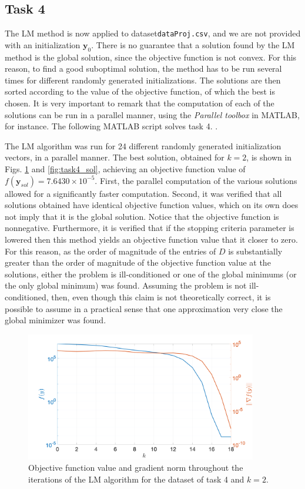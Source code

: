\documentclass[12pt]{article}
\begin{document}
\subsection{Task 4}
The LM method is now applied to dataset\verb|dataProj.csv|, and we are not provided with an initialization $\mathbf{y}_0$. There is no guarantee that a solution found by the LM method is the global solution, since the objective function is not convex. For this reason, to find a good suboptimal solution, the method has to be run several times for different randomly generated initializations. The solutions are then sorted according to the value of the objective function, of which the best is chosen. It is very important to remark that the computation of each of the solutions can be run in a parallel manner, using the \textit{Parallel toolbox} in MATLAB, for instance. The following MATLAB script solves task 4.
.

The LM algorithm was run for 24 different randomly generated initialization vectors, in a parallel manner. The best solution, obtained for $k=2$, is shown in Figs. \ref{fig:task4_LM} and \ref{fig:task4_sol}, achieving an objective function value of $f(\mathbf{y}_{sol}) = 7.6430\times 10^{-5}$. First, the parallel computation of the various solutions allowed for a significantly faster computation. Second, it was verified that all solutions obtained have identical objective function values, which on its own does not imply that it is the global solution. Notice that the objective function is nonnegative. Furthermore, it is verified that if the stopping criteria parameter is lowered then this method yields an objective function value that it closer to zero. For this reason, as the order of magnitude of the entries of $D$ is substantially greater than the order of magnitude of the objective function value at the solutions, either the problem is ill-conditioned or one of the global minimums (or the only global minimum) was found. Assuming the problem is not ill-conditioned, then, even though this claim is not theoretically correct, it is possible to assume in a practical sense that one approximation very close the global minimizer was found. 
\begin{figure}[ht!]
	\centering
	\includegraphics[width=0.9\textwidth]{figures/task4_LM.png}
	\caption{Objective function value and gradient norm throughout the iterations of the LM algorithm for the dataset of task 4 and $k=2$.}
	\label{fig:task4_LM}
\end{figure}
\end{document}

